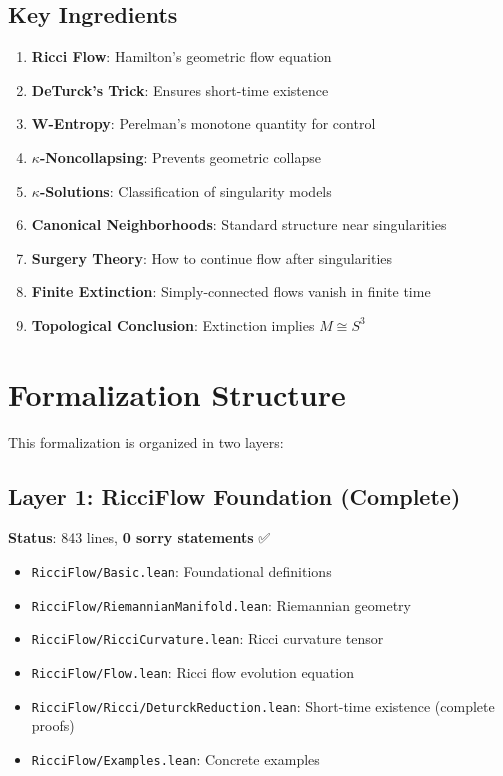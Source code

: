 \subsection{Key Ingredients}

\begin{enumerate}
\item \textbf{Ricci Flow}: Hamilton's geometric flow equation
\item \textbf{DeTurck's Trick}: Ensures short-time existence
\item \textbf{W-Entropy}: Perelman's monotone quantity for control
\item \textbf{$\kappa$-Noncollapsing}: Prevents geometric collapse
\item \textbf{$\kappa$-Solutions}: Classification of singularity models
\item \textbf{Canonical Neighborhoods}: Standard structure near singularities
\item \textbf{Surgery Theory}: How to continue flow after singularities
\item \textbf{Finite Extinction}: Simply-connected flows vanish in finite time
\item \textbf{Topological Conclusion}: Extinction implies $M \cong S^3$
\end{enumerate}

\section{Formalization Structure}

This formalization is organized in two layers:

\subsection{Layer 1: RicciFlow Foundation (Complete)}

\textbf{Status}: 843 lines, \textbf{0 sorry statements} ✅

\begin{itemize}
\item \texttt{RicciFlow/Basic.lean}: Foundational definitions
\item \texttt{RicciFlow/RiemannianManifold.lean}: Riemannian geometry
\item \texttt{RicciFlow/RicciCurvature.lean}: Ricci curvature tensor
\item \texttt{RicciFlow/Flow.lean}: Ricci flow evolution equation
\item \texttt{RicciFlow/Ricci/DeturckReduction.lean}: Short-time existence (complete proofs)
\item \texttt{RicciFlow/Examples.lean}: Concrete examples
\end{itemize}

